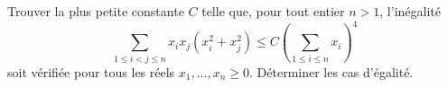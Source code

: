 Trouver la plus petite constante $C$ telle que, pour tout entier $n > 1$, l'inégalité
\[ \sum_{1 \le i < j \le n} x_i x_j (x_i^2 + x_j^2) \le C \left( \sum_{1 \le i \le n} x_i \right)^4 \]
soit vérifiée pour tous les réels $x_1, \dots, x_n \ge 0$. Déterminer les cas d'égalité.
